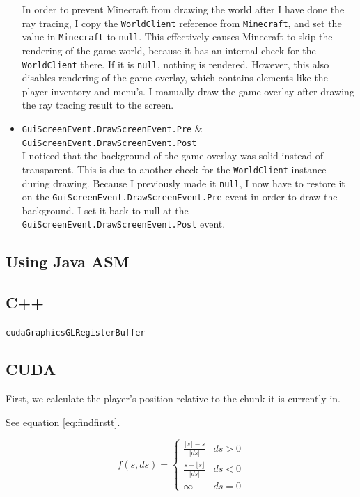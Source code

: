 \documentclass[]{article}
\begin{document}
\begin{itemize}
    In order to prevent Minecraft from drawing the world after I have done the ray tracing, I copy the \texttt{WorldClient} reference from \texttt{Minecraft}, and set the value in \texttt{Minecraft} to \texttt{null}.
    This effectively causes Minecraft to skip the rendering of the game world, because it has an internal check for the \texttt{WorldClient} there.
    If it is \texttt{null}, nothing is rendered.
    However, this also disables rendering of the game overlay, which contains elements like the player inventory and menu's.
    I manually draw the game overlay after drawing the ray tracing result to the screen.
  \item \texttt{GuiScreenEvent.DrawScreenEvent.Pre} \& \texttt{GuiScreenEvent.DrawScreenEvent.Post} \\
    I noticed that the background of the game overlay was solid instead of transparent.
    This is due to another check for the \texttt{WorldClient} instance during drawing.
    Because I previously made it \texttt{null}, I now have to restore it on the \texttt{GuiScreenEvent.DrawScreenEvent.Pre} event in order to draw the background.
    I set it back to null at the \texttt{GuiScreenEvent.DrawScreenEvent.Post} event.
\end{itemize}

\subsection{Using Java ASM}

\subsection{C++}
\texttt{cudaGraphicsGLRegisterBuffer}


\subsection{CUDA}
First, we calculate the player's position relative to the chunk it is currently in.



See equation \ref{eq:findfirstt}.

\begin{equation}
f(s, ds) =
\begin{cases}
\frac{\lceil s \rceil - s}{\lvert ds \rvert} & ds > 0 \\
\frac{s - \lfloor s \rfloor}{\lvert ds \rvert} & ds < 0 \\
\infty & ds = 0
\end{cases}
\label{eq:findfirstt}
\end{equation}
\end{document}
